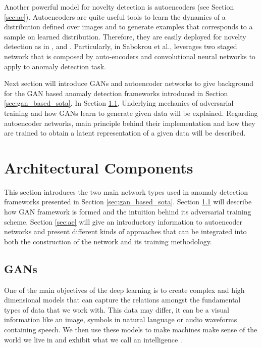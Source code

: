 Another powerful model for novelty detection is autoencoders (see Section \ref{sec:ae}). Autoencoders are quite useful 
tools to learn the dynamics of a distribution defined over images and to generate examples that corresponds 
to a sample on learned distribution. Therefore, they are easily deployed for novelty 
detection as in \cite{an2015variational}, \cite{leveau2017adversarial} and
\cite{Pidhorskyi:2018:GPN:3327757.3327787}. Particularly, in Sabokrou et al.\cite{sabokrou2018adversarially},
leverages two staged network that is composed by auto-encoders and convolutional neural networks to apply to
anomaly detection task. 

Next section will introduce GANs and autoencoder networks to give background 
for the GAN based anomaly detection frameworks introduced in Section \ref{sec:gan_based_sota}. In Section 
\ref{sec:gan}, Underlying mechanics of adversarial training and how GANs learn 
to generate given data will be explained. Regarding autoencoder networks, main principle behind their 
implementation and how they are trained to obtain a latent representation of a given 
data will be described.


\section{Architectural Components}
\label{sec:arch_comp}
This section introduces the two main network types used in  anomaly detection
frameworks presented in Section \ref{sec:gan_based_sota}. Section \ref{sec:gan} will describe how GAN
framework is formed and the intuition behind its adversarial training scheme. Section 
\ref{sec:ae} will give an introductory information to autoencoder networks and present different kinds of
approaches that can be integrated into both the construction of the network and its training
methodology. 

\subsection{GANs}
\label{sec:gan}

One of the main objectives of the deep learning is to create complex and high dimensional
models that can capture the relations amongst the fundamental types of data that we work with. 
This data may differ, it can be a visual information like an image,
symbols in natural language or audio waveforms containing speech. We then use these models to make
machines make sense of the world we live in and exhibit what we call an intelligence
\cite{Bengio:2009:LDA:1658423.1658424}.

